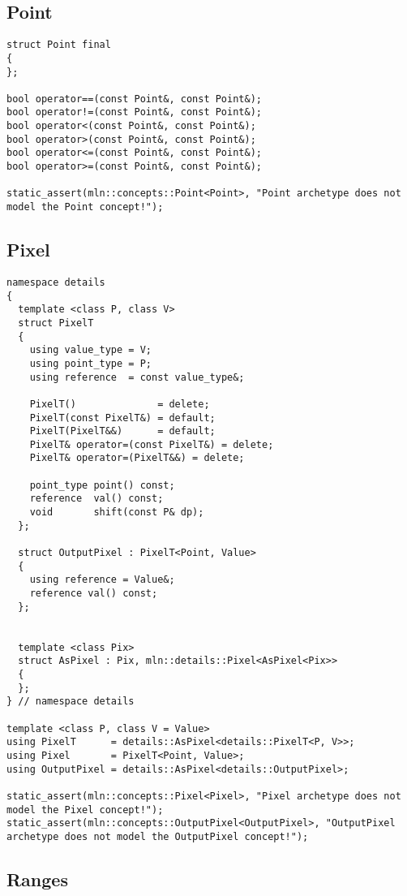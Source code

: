 \subsection{Point}

\begin{verbatim}
struct Point final
{
};

bool operator==(const Point&, const Point&);
bool operator!=(const Point&, const Point&);
bool operator<(const Point&, const Point&);
bool operator>(const Point&, const Point&);
bool operator<=(const Point&, const Point&);
bool operator>=(const Point&, const Point&);

static_assert(mln::concepts::Point<Point>, "Point archetype does not model the Point concept!");
\end{verbatim}


\subsection{Pixel}

\begin{verbatim}
namespace details
{
  template <class P, class V>
  struct PixelT
  {
    using value_type = V;
    using point_type = P;
    using reference  = const value_type&;

    PixelT()              = delete;
    PixelT(const PixelT&) = default;
    PixelT(PixelT&&)      = default;
    PixelT& operator=(const PixelT&) = delete;
    PixelT& operator=(PixelT&&) = delete;

    point_type point() const;
    reference  val() const;
    void       shift(const P& dp);
  };

  struct OutputPixel : PixelT<Point, Value>
  {
    using reference = Value&;
    reference val() const;
  };


  template <class Pix>
  struct AsPixel : Pix, mln::details::Pixel<AsPixel<Pix>>
  {
  };
} // namespace details

template <class P, class V = Value>
using PixelT      = details::AsPixel<details::PixelT<P, V>>;
using Pixel       = PixelT<Point, Value>;
using OutputPixel = details::AsPixel<details::OutputPixel>;

static_assert(mln::concepts::Pixel<Pixel>, "Pixel archetype does not model the Pixel concept!");
static_assert(mln::concepts::OutputPixel<OutputPixel>, "OutputPixel archetype does not model the OutputPixel concept!");
\end{verbatim}


\subsection{Ranges}

